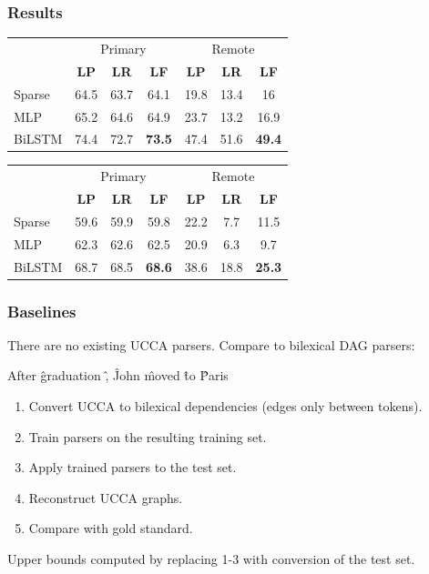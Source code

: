 \documentclass[t]{beamer}
\begin{document}
\begin{frame}
\frametitle{Results}
\begin{center}
	\begin{tabular}{l|ccc|ccc}
	& \multicolumn{3}{c|}{Primary} & \multicolumn{3}{c}{Remote} \\
	& \textbf{LP} & \textbf{LR} & \textbf{LF} & \textbf{LP} & \textbf{LR} & \textbf{LF} \\
	\hline
	Sparse
	& 64.5 & 63.7 & 64.1 & 19.8 & 13.4 & 16 \\
	MLP
	& 65.2 & 64.6 & 64.9 & 23.7 & 13.2 & 16.9 \\
	BiLSTM
	& 74.4 & 72.7 & \textbf{73.5} & 47.4 & 51.6 & \textbf{49.4}
	\end{tabular}
	
	\vfill
	\pause
	\begin{tabular}{l|ccc|ccc}
	& \multicolumn{3}{c|}{Primary} & \multicolumn{3}{c}{Remote} \\
	& \textbf{LP} & \textbf{LR} & \textbf{LF} & \textbf{LP} & \textbf{LR} & \textbf{LF} \\
	\hline
	Sparse
	& 59.6 & 59.9 & 59.8 & 22.2 & 7.7 & 11.5 \\
	MLP
	& 62.3 & 62.6 & 62.5 & 20.9 & 6.3 & 9.7 \\
	BiLSTM
	& 68.7 & 68.5 & \textbf{68.6} & 38.6 & 18.8 & \textbf{25.3}
	\end{tabular}
\end{center}
\end{frame}

\begin{frame}
\frametitle{Baselines}
There are no existing UCCA parsers. Compare to bilexical DAG parsers:
\begin{center}
	\begin{dependency}[theme = simple]
	\begin{deptext}[column sep=.7em,ampersand replacement=\^,font=\rmfamily]
	After \^ graduation \^ , \^ John \^ moved \^ to \^ Paris \\
	\end{deptext}
	\end{dependency}
\end{center}

\vfill
\pause
\begin{enumerate}
 \item Convert UCCA to bilexical dependencies (edges only between tokens).
 \item Train parsers on the resulting training set.
 \item Apply trained parsers to the test set.
 \item Reconstruct UCCA graphs.
 \item Compare with gold standard.
\end{enumerate}

Upper bounds computed by replacing 1-3 with conversion of the test set.
\end{frame}
\end{document}
